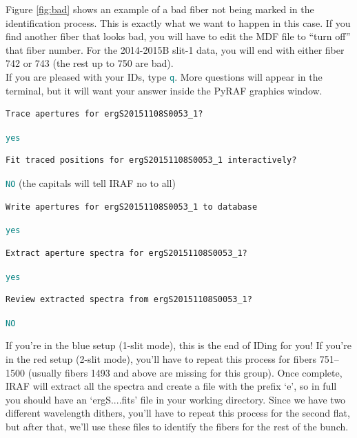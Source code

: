 \documentclass[12pt]{report}
\newcommand{\ty}[1]{\textcolor{teal}{\texttt{#1}}}
\begin{document}
\begin{enumerate}
Figure \autoref{fig:bad} shows an example of a bad fiber not being marked in the identification process. This is exactly what we want to happen in this case. If you find another fiber that looks bad, you will have to edit the MDF file to ``turn off'' that fiber number. For the 2014-2015B slit-1 data, you will end with either fiber 742 or 743 (the rest up to 750 are bad). \\

If you are pleased with your IDs, type \ty{q}. More questions will appear in the terminal, but it will want your answer inside the PyRAF graphics window.

\begin{verbatim}
Trace apertures for ergS20151108S0053_1? 
\end{verbatim}

\ty{yes}

\begin{verbatim}
Fit traced positions for ergS20151108S0053_1 interactively?
\end{verbatim}

\ty{NO} (the capitals will tell IRAF no to all)

\begin{verbatim}
Write apertures for ergS20151108S0053_1 to database
\end{verbatim}

\ty{yes}

\begin{verbatim}
Extract aperture spectra for ergS20151108S0053_1?
\end{verbatim}

\ty{yes}

\begin{verbatim}
Review extracted spectra from ergS20151108S0053_1?
\end{verbatim}

\ty{NO}

If you're in the blue setup (1-slit mode), this is the end of IDing for you! If you're in the red setup (2-slit mode), you'll have to repeat this process for fibers 751--1500 (usually fibers 1493 and above are missing for this group). Once complete, IRAF will extract all the spectra and create a file with the prefix `e', so in full you should have an `ergS....fits' file in your working directory. Since we have two different wavelength dithers, you'll have to repeat this process for the second flat, but after that, we'll use these files to identify the fibers for the rest of the bunch.

\end{enumerate}
\end{document}
